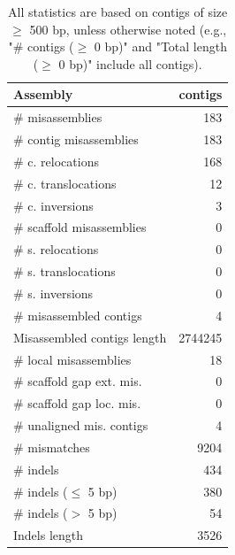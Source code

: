 \documentclass[12pt,a4paper]{article}
\begin{document}
\begin{table}[ht]
\begin{center}
\caption{All statistics are based on contigs of size $\geq$ 500 bp, unless otherwise noted (e.g., "\# contigs ($\geq$ 0 bp)" and "Total length ($\geq$ 0 bp)" include all contigs).}
\begin{tabular}{|l*{1}{|r}|}
\hline
Assembly & contigs \\ \hline
\# misassemblies & 183 \\ \hline
\hspace{2mm}\# contig misassemblies & 183 \\ \hline
\hspace{5mm}\# c. relocations & 168 \\ \hline
\hspace{5mm}\# c. translocations & 12 \\ \hline
\hspace{5mm}\# c. inversions & 3 \\ \hline
\hspace{2mm}\# scaffold misassemblies & 0 \\ \hline
\hspace{5mm}\# s. relocations & 0 \\ \hline
\hspace{5mm}\# s. translocations & 0 \\ \hline
\hspace{5mm}\# s. inversions & 0 \\ \hline
\# misassembled contigs & 4 \\ \hline
Misassembled contigs length & 2744245 \\ \hline
\# local misassemblies & 18 \\ \hline
\# scaffold gap ext. mis. & 0 \\ \hline
\# scaffold gap loc. mis. & 0 \\ \hline
\# unaligned mis. contigs & 4 \\ \hline
\# mismatches & 9204 \\ \hline
\# indels & 434 \\ \hline
\hspace{5mm}\# indels ($\leq$ 5 bp) & 380 \\ \hline
\hspace{5mm}\# indels ($>$ 5 bp) & 54 \\ \hline
Indels length & 3526 \\ \hline
\end{tabular}
\end{center}
\end{table}
\end{document}
